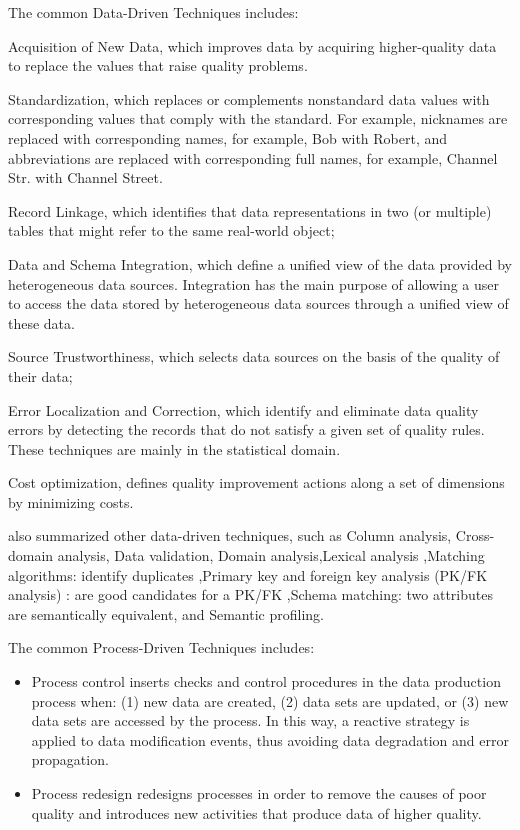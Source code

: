 \documentclass[pdftex,english,oribibl]{llncs}
\begin{document}
The common Data-Driven Techniques includes:
\begin{itemsize}
    \item Acquisition of New Data, which improves data by acquiring higher-quality data to replace the values that raise quality problems.
    \item Standardization, which replaces or complements nonstandard data values with corresponding values that comply with the standard. For example, nicknames are replaced with corresponding names, for example, Bob with Robert, and abbreviations are replaced with corresponding full names, for example, Channel Str. with Channel Street.
    \item Record Linkage, which identifies that data representations in two (or multiple) tables that might refer to the same real-world object;
    \item Data and Schema Integration, which define a unified view of the data provided by heterogeneous data sources. Integration has the main purpose of allowing a user to access the data stored by heterogeneous data sources through a unified view of these data.
    \item Source Trustworthiness, which selects data sources on the basis of the quality of their data;
    \item Error Localization and Correction, which identify and eliminate data quality errors by detecting the records that do not satisfy a given set of quality rules. These techniques are mainly in the statistical domain.
    \item Cost optimization, defines quality improvement actions along a set of dimensions by minimizing costs.
\end{itemsize}

\citet{Borek2011AClassficationOfDataQualityAssessmentMethod} also summarized other data-driven techniques, such as Column analysis, Cross-domain analysis, Data validation, Domain analysis,Lexical analysis
,Matching algorithms: identify duplicates
,Primary key and foreign key analysis (PK/FK analysis) : are good candidates for a PK/FK
,Schema matching: two attributes are semantically equivalent, and Semantic profiling.

The common Process-Driven Techniques includes:
\begin{itemize}
    \item Process control inserts checks and control procedures in the data production process when: (1) new data are created, (2) data sets are updated, or (3) new data sets are accessed by the process. In this way, a reactive strategy is applied to data modification events, thus avoiding data degradation and error propagation.
    \item Process redesign redesigns processes in order to remove the causes of poor quality and introduces new activities that produce data of higher quality.
\end{itemize}
\end{document}
